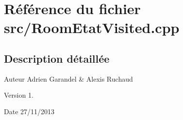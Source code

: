 \section{Référence du fichier src/\-Room\-Etat\-Visited.cpp}
\label{_room_etat_visited_8cpp}


\subsection{Description détaillée}
\begin{DoxyAuthor}{Auteur}
Adrien Garandel \& Alexis Ruchaud 
\end{DoxyAuthor}
\begin{DoxyVersion}{Version}
1. 
\end{DoxyVersion}
\begin{DoxyDate}{Date}
27/11/2013 
\end{DoxyDate}
